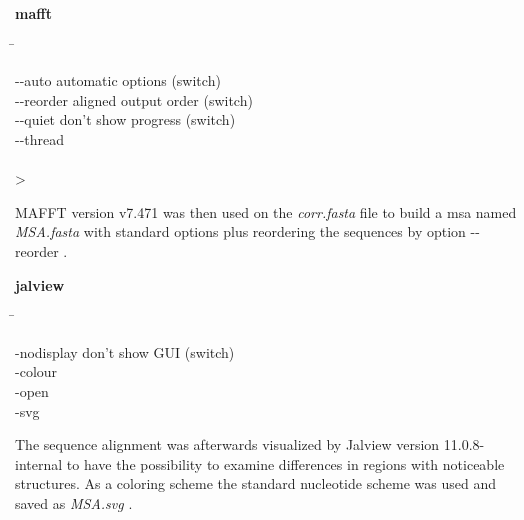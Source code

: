     \begin{leftbar}
        \textbf{mafft}
        \begin{nstabbing}
            \qquad\qquad\qquad \= \kill
        
            -{}-{}auto \> automatic options (switch)\\
        
            -{}-{}reorder \> aligned output order (switch)\\
            
            -{}-{}quiet \> don't show progress (switch)\\
            
            -{}-{}thread \\
            
            \\
            
            > 
        \end{nstabbing}
    \end{leftbar}
    
    MAFFT version v7.471 was then used on the \textit{corr.fasta} file to build a \gls{msa} named \textit{MSA.fasta} with standard options plus reordering the sequences by option \colorbox{backcolour}{-{}-{}reorder} \autocite{MAFFT}. 
    
    \begin{leftbar}
        \textbf{jalview}
        \begin{nstabbing}
            \qquad\qquad\qquad \= \kill
        
            -{}nodisplay \> don't show GUI (switch)\\
        
            -{}colour \> [colorscheme]\\
            
            -{}open \\
            
            -{}svg 
        \end{nstabbing}
    \end{leftbar}

    The sequence alignment was afterwards visualized by Jalview version 11.0.8-internal to have the possibility to examine differences in regions with noticeable structures. As a coloring scheme the standard nucleotide scheme was used and saved as \textit{MSA.svg} \autocite{Jalview}.

